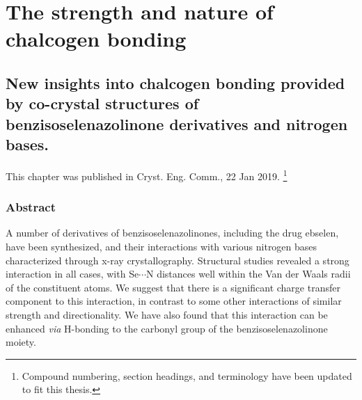 \part{The strength and nature of chalcogen bonding}

\begin{refsection}

\chapter[Insights from co-crystal structures]{New insights into chalcogen bonding provided by co-crystal structures of benzisoselenazolinone derivatives and nitrogen bases.}
\label{sec:crystengcomm1}

This chapter was published in Cryst. Eng. Comm., 22 Jan 2019\autocite{Fellowes2019}. \footnote{Compound numbering, section headings, and terminology have been updated to fit this thesis.}

\section{Abstract}
A number of derivatives of benzisoselenazolinones, including the drug ebselen, have been synthesized, and their interactions with various nitrogen bases characterized through x-ray crystallography.
Structural studies revealed a strong interaction in all cases, with Se$\cdots$N distances well within the Van der Waals radii of the constituent atoms.
We suggest that there is a significant charge transfer component to this interaction, in contrast to some other interactions of similar strength and directionality.
We have also found that this interaction can be enhanced \emph{via} H-bonding to the carbonyl group of the benzisoselenazolinone moiety.



\end{refsection}
